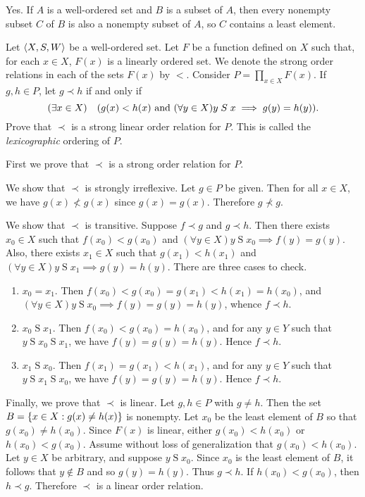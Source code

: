\begin{solution}
Yes. If $A$ is a well-ordered set and $B$ is a subset of $A$, then every nonempty subset $C$ of $B$ is also a nonempty
subset of $A$, so $C$ contains a least element.
\end{solution}

\begin{exercise}
Let $\left\langle X,S,W\right\rangle$ be a well-ordered set. Let $F$ be a function defined on $X$ such that,
for each $x\in X$, $F(x)$ is a linearly ordered set. We denote the strong order relations in each of
the sets $F(x)$ by $<$. Consider $P=\prod_{x\in X}F(x)$. If $g,h\in P$, let $g\prec h$ if and only if
\[(\exists x\in X)\quad \prn{g(x) < h(x)\land (\forall y\in X) y\mathrel S x \implies g(y)=h(y)}.\]
Prove that $\prec$ is a strong linear order relation for $P$.
This is called the \textit{lexicographic} ordering of $P$.
\end{exercise}

\begin{solution}
First we prove that $\prec$ is a strong order relation for $P$.

We show that $\prec$ is strongly irreflexive. Let $g\in P$ be given. Then for all $x\in X$, we have
$g(x)\nless g(x)$ since $g(x)=g(x)$. Therefore $g\nprec g$.

We show that $\prec$ is transitive. Suppose $f\prec g$ and $g\prec h$.
Then there exists $x_0\in X$ such that $f(x_0)<g(x_0)$ and $(\forall y\in X)y\mathrel S x_0\implies f(y)=g(y)$.
Also, there exists $x_1\in X$ such that $g(x_1)<h(x_1)$ and $(\forall y\in X)y\mathrel S x_1\implies g(y)=h(y)$.
There are three cases to check.
\begin{enumerate}
    \item $x_0 = x_1$. Then $f(x_0) < g(x_0) = g(x_1) < h(x_1) = h(x_0)$, and
    $(\forall y\in X)y\mathrel S x_0\implies f(y)=g(y)=h(y)$, whence $f\prec h$.

    \item $x_0 \mathrel S x_1$.  Then $f(x_0)<g(x_0)=h(x_0)$, and for any $y\in Y$ such that
    $y\mathrel S x_0\mathrel S x_1$, we have $f(y)=g(y)=h(y)$. Hence $f\prec h$.

    \item $x_1 \mathrel S x_0$.  Then $f(x_1)=g(x_1)<h(x_1)$, and for any $y\in Y$ such that
    $y\mathrel S x_1\mathrel S x_0$, we have $f(y)=g(y)=h(y)$. Hence $f\prec h$.
\end{enumerate}

Finally, we prove that $\prec$ is linear. Let $g,h\in P$ with $g\neq h$.
Then the set $B=\left\{ x\in X : g(x)\neq h(x) \right\}$ is nonempty. Let $x_0$ be the least element of $B$
so that $g(x_0)\neq h(x_0)$.
Since $F(x)$ is linear, either $g(x_0)<h(x_0)$ or $h(x_0)<g(x_0)$.
Assume without loss of generalization that $g(x_0)<h(x_0)$.
Let $y\in X$ be arbitrary, and suppose $y\mathrel S x_0$. Since $x_0$ is the least element of $B$, it follows
that $y\nin B$ and so $g(y)=h(y)$.
Thus $g\prec h$. If $h(x_0)<g(x_0)$, then $h\prec g$.
Therefore $\prec$ is a linear order relation.
\end{solution}


